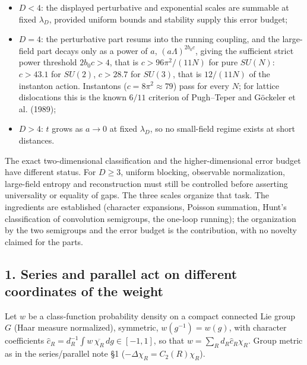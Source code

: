 \documentclass[11pt,a4paper]{article}
\newcommand{\tightlist}{\setlength{\itemsep}{0pt}\setlength{\parskip}{0pt}}
\begin{document}
\begin{enumerate}
  \begin{itemize}
  \tightlist
  \item
    \(D<4\): the displayed perturbative and exponential scales are
    summable at fixed \(\lambda_D\), provided uniform bounds and
    stability supply this error budget;
  \item
    \(D=4\): the perturbative part resums into the running coupling, and
    the large-field part decays only as a power of \(a\),
    \((a\Lambda)^{2b_0c}\), giving the sufficient strict power threshold
    \(2b_0c>4\), that is \(c>96\pi^2/(11N)\) for pure \(SU(N)\):
    \(c>43.1\) for \(SU(2)\), \(c>28.7\) for \(SU(3)\), that is
    \(12/(11N)\) of the instanton action. Instantons
    (\(c=8\pi^2\approx79\)) pass for every \(N\); for lattice
    dislocations this is the known \(6/11\) criterion of Pugh--Teper and
    Göckeler et al. (1989);
  \item
    \(D>4\): \(t\) grows as \(a\to0\) at fixed \(\lambda_D\), so no
    small-field regime exists at short distances.
  \end{itemize}
\end{enumerate}

The exact two-dimensional classification and the higher-dimensional
error budget have different status. For \(D\ge3\), uniform blocking,
observable normalization, large-field entropy and reconstruction must
still be controlled before asserting universality or equality of gaps.
The three scales organize that task. The ingredients are established
(character expansions, Poisson summation, Hunt's classification of
convolution semigroups, the one-loop running); the organization by the
two semigroups and the error budget is the contribution, with no novelty
claimed for the parts.

\hypertarget{series-and-parallel-act-on-different-coordinates-of-the-weight}{%
\subsection{1. Series and parallel act on different coordinates of the
weight}\label{series-and-parallel-act-on-different-coordinates-of-the-weight}}

Let \(w\) be a class-function probability density on a compact connected
Lie group \(G\) (Haar measure normalized), symmetric,
\(w(g^{-1})=w(g)\), with character coefficients
\(\hat c_R=d_R^{-1}\int w\,\overline{\chi_R}\,dg\in[-1,1]\), so that
\(w=\sum_Rd_R\hat c_R\chi_R\). Group metric as in the series/parallel
note §1 (\(-\Delta\chi_R=C_2(R)\chi_R\)).
\end{document}
